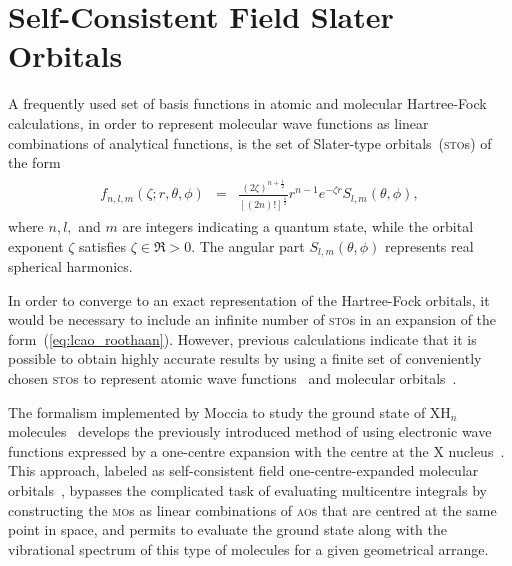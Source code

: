 


\section{Self-Consistent Field Slater Orbitals}
\label{ch:scf_sto}

A frequently used set of basis functions in atomic and molecular
Hartree-Fock calculations, in order to represent molecular wave
functions as linear combinations of analytical functions, is the set
of Slater-type orbitals~(\textsc{sto}s) of the form
%
\begin{eqnarray}
  \begin{split}
    f_{n,l,m}(\zeta;r,\theta,\phi) & = &
    \frac{(2\zeta)^{n + \frac{1}{2}}}{[(2n)!]^{\frac{1}{2}}} r^{n-1} e^{-\zeta r}
    S_{l,m}(\theta,\phi),
  \end{split}
  \label{eq:f_STO}
\end{eqnarray}
%
where $n,l,$ and $m$ are integers indicating a quantum state, while
the orbital exponent $\zeta$ satisfies $\zeta \in \Re > 0 $. The
angular part $S_{l,m}(\theta,\phi)$ represents real spherical
harmonics.

In order to converge to an exact representation of the Hartree-Fock
orbitals, it would be necessary to include an infinite number of
\textsc{sto}s in an expansion of the
form~(\ref{eq:lcao_roothaan}). However, previous calculations indicate
that it is possible to obtain highly accurate results by using a
finite set of conveniently chosen \textsc{sto}s to represent atomic
wave
functions~\cite{Clementi_scfIon_1962,Clementi_STOatoms_1974,Bunge_STOtable_1993}
and molecular
orbitals~\cite{Moccia_JCP_2164,Moccia_JCP_2176,Moccia_1964}.

The formalism implemented by Moccia to study the ground state of
XH$_{n}$ molecules~\cite{Moccia_JCP_2164,Moccia_JCP_2176,Moccia_1964}
develops the previously introduced method of using electronic wave
functions expressed by a one-centre expansion with the centre at the X
nucleus~\cite{Parr_JCP_1960,oneCentre_1961}. This approach, labeled as
self-consistent field one-centre-expanded molecular
orbitals~\cite{Moccia_JCP_2164}, bypasses the complicated task of
evaluating multicentre integrals by constructing the \textsc{mo}s as
linear combinations of \textsc{ao}s that are centred at the same point
in space, and permits to evaluate the ground state along with the
vibrational spectrum of this type of molecules for a given geometrical
arrange.

